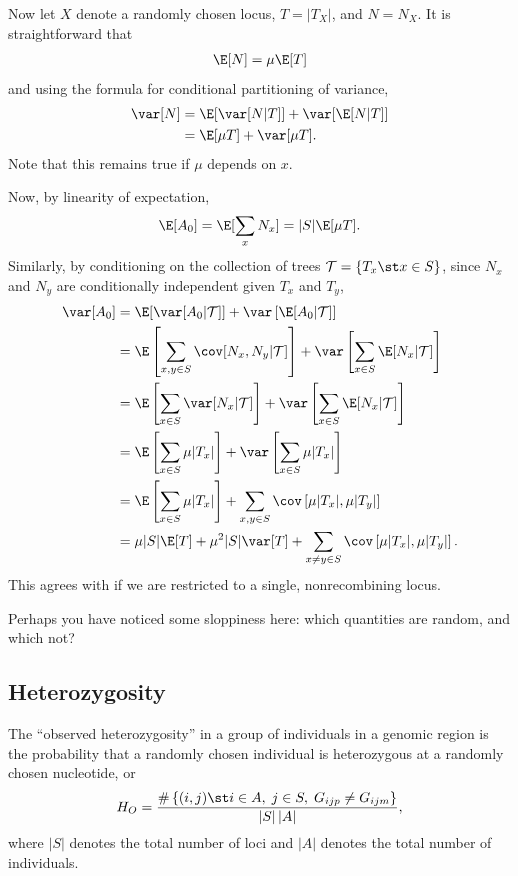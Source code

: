 Now let $X$ denote a randomly chosen locus,
$T = |T_X|$, and $N = N_X$.
It is straightforward that
\begin{align}
  \E[N] = \mu \E[T]
\end{align}
and using the formula for conditional partitioning of variance,
\begin{align}
  \var[N] &= \E[ \var[N|T] ] + \var[ \E[N|T] ] \\
    &= \E[ \mu T ] + \var[ \mu T ] .
\end{align}
Note that this remains true if $\mu$ depends on $x$.

Now, by linearity of expectation,
\begin{align}
  \E[A_0] = \E[ \sum_x N_x] = |S| \E[\mu T] .
\end{align}
Similarly, by conditioning on the collection of trees $\mathcal{T} = \{ T_x \st x \in S\}$,
since $N_x$ and $N_y$ are conditionally independent given $T_x$ and $T_y$,
\begin{align}
  \var[A_0] &= \E[ \var[A_0 | \mathcal{T} ] ] + \var\left[ \E[ A_0 | \mathcal{T} ] \right] \\
  &= \E \left[ \sum_{x,y\in S} \cov[N_x,N_y|\mathcal{T}] \right] + \var\left[ \sum_{x \in S} \E[ N_x | \mathcal{T} ] \right] \\
  &= \E \left[ \sum_{x\in S} \var[N_x|\mathcal{T}] \right] + \var\left[ \sum_{x \in S} \E[ N_x | \mathcal{T} ] \right] \\
  &= \E \left[ \sum_{x \in S} \mu |T_x| \right] + \var\left[ \sum_{x \in S} \mu |T_x| \right] \\
  &= \E \left[ \sum_{x \in S} \mu |T_x| \right] + \sum_{x,y \in S} \cov\left[ \mu |T_x|, \mu |T_y| \right] \\
  &= \mu |S| \E [ T ] + \mu^2 |S| \var[T] + \sum_{x \neq y \in S} \cov\left[ \mu |T_x|, \mu |T_y| \right] .
\end{align}
This agrees with \citet{hudson1990gene} if we are restricted to a single, nonrecombining locus.

Perhaps you have noticed some sloppiness here:
which quantities are random, and which not?


\subsection{Heterozygosity} 

The ``observed heterozygosity'' in a group of individuals in a genomic region 
is the probability that a randomly chosen individual is heterozygous at a randomly chosen nucleotide,
or 
\begin{align}
  H_O = \frac{ \# \left\{ (i,j) \st i \in A, \; j \in S, \; G_{ijp} \neq G_{ijm} \right\} }{ |S|\,|A| } ,
\end{align}
where $|S|$ denotes the total number of loci and $|A|$ denotes the total number of individuals.

